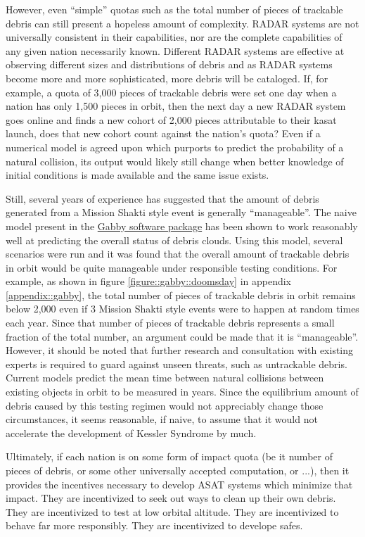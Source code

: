 However, even ``simple'' quotas such as the total number of pieces of
trackable debris can still present a hopeless amount of complexity.
RADAR systems are not universally consistent in their
capabilities\cite[T4]{cpl-oreilly}, nor are the complete capabilities
of any given nation necessarily known. Different RADAR systems are
effective at observing different sizes and distributions of debris and
as RADAR systems become more and more sophisticated, more debris will
be cataloged.  If, for example, a quota of 3,000 pieces of trackable
debris were set one day when a nation has only 1,500 pieces in orbit,
then the next day a new RADAR system goes online and finds a new
cohort of 2,000 pieces attributable to their \ac{kasat} launch, does
that new cohort count against the nation's quota?  Even if a numerical
model is agreed upon which purports to predict the probability of a
natural collision, its output would likely still change when better
knowledge of initial conditions is made available and the same issue
exists.

Still, several years of experience has suggested that the amount of
debris generated from a Mission Shakti style event is generally
``manageable''.  The naive model present in the
\href{https://github.com/harrison-caudill/gabby}{Gabby software
  package} has been shown to work reasonably well at predicting the
overall status of debris clouds.\cite{gabby} Using this model, several
scenarios were run and it was found that the overall amount of
trackable debris in orbit would be quite manageable under responsible
testing conditions.  For example, as shown in figure
\ref{figure::gabby::doomsday} in appendix \ref{appendix::gabby}, the
total number of pieces of trackable debris in orbit remains below
2,000 even if 3 Mission Shakti style events were to happen at random
times each year.  Since that number of pieces of trackable debris
represents a small fraction of the total number, an argument could be
made that it is ``manageable''.  However, it should be noted that
further research and consultation with existing experts is required to
guard against unseen threats, such as untrackable debris.  Current
models predict the mean time between natural collisions between
existing objects in orbit to be measured in
years.\cite[p6]{kessler-reunion} Since the equilibrium amount of
debris caused by this testing regimen would not appreciably change
those circumstances, it seems reasonable, if naive, to assume that it
would not accelerate the development of Kessler Syndrome by much.

Ultimately, if each nation is on some form of impact quota (be it
number of pieces of debris, or some other universally accepted
computation, or ...), then it provides the incentives necessary to
develop ASAT systems which minimize that impact.  They are
incentivized to seek out ways to clean up their own debris.  They are
incentivized to test at low orbital altitude.  They are incentivized
to behave far more responsibly.  They are incentivized to develope
\acp{safe}.

